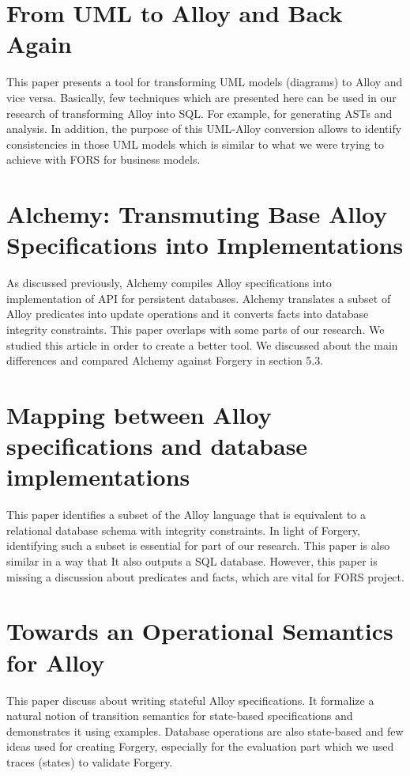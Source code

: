 \documentclass[oneside]{book}
\begin{document}
\section{From UML to Alloy and Back Again}
This paper presents a tool for transforming
UML models (diagrams) to Alloy and vice versa. Basically, few techniques which are presented here can be used in our research of transforming Alloy into SQL. For example, for generating ASTs and analysis. In addition, the purpose of this UML-Alloy conversion allows to identify consistencies in those UML models which is similar to what we were trying to achieve with FORS for business models. 

\section{Alchemy: Transmuting Base Alloy Specifications into Implementations}
As discussed previously, Alchemy compiles Alloy specifications into implementation of API for persistent databases. Alchemy translates a subset of Alloy predicates into update operations and it converts facts into database integrity constraints. This paper overlaps with some parts of our research. We studied this article in order to create a better tool. We discussed about the main differences and compared Alchemy against Forgery in section 5.3.

\section{Mapping between Alloy specifications and database implementations}

This paper identifies a subset of the Alloy language that is equivalent to a relational database schema with integrity constraints. In light of Forgery, identifying such a subset is essential for part of our research. This paper is also similar in a way that It also outputs a SQL database. However, this paper is missing a discussion about predicates and facts, which are vital for FORS project.

\section{Towards an Operational Semantics for Alloy}
This paper discuss about writing stateful Alloy specifications. It formalize a natural notion of transition semantics for state-based specifications and demonstrates it using examples. Database operations are also state-based and few ideas used for creating Forgery, especially for the evaluation part which we used traces (states) to validate Forgery.
\end{document}
